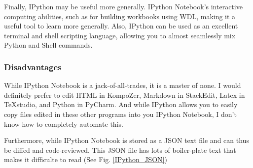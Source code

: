 \documentclass[]{article}
\begin{document}
		Finally, IPython may be useful more generally.  IPython Notebook's interactive computing abilities, such as for building workbooks using WDL, making it a useful tool to learn more generally.  Also, IPython can be used as an excellent terminal and shell scripting language, allowing you to almost seamlessly mix Python and Shell commands.
	\subsubsection{Disadvantages}
		While IPython Notebook is a jack-of-all-trades, it is a master of none.  I would definitely prefer to edit HTML in KompoZer, Markdown in StackEdit, Latex in TeXstudio, and Python in PyCharm.  And while IPython allows you to easily copy files edited in these other programs into you IPython Notebook, I don't know how to completely automate this.
		
		Furthermore, while IPython Notebook is stored as a JSON text file and can thus be diffed and code-reviewed,  This JSON file has lots of boiler-plate text that makes it difficulte to read (See Fig. \ref{IPython_JSON})
		
\end{document}
